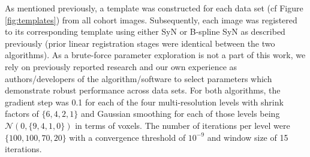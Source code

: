 \documentclass{frontiersSCNS}
\begin{document}

As mentioned previously, a template was constructed for each data
set (cf Figure \ref{fig:templates}) from all cohort images.  Subsequently, 
each image was registered to its corresponding template using either 
SyN or B-spline SyN as described previously (prior linear registration 
stages were identical between the two algorithms).  As a brute-force parameter
exploration is not a part of this work, we rely on previously
reported research \citep{klein2009,avants2011} and our own experience as
authors/developers of the algorithm/software to select parameters which 
demonstrate robust performance across data sets.  For both algorithms,
the gradient step was 0.1 for each of the four multi-resolution levels
with shrink factors of $\{6,4,2,1\}$ and Gaussian smoothing for each
of those levels being $\mathcal{N}\left(0,\{9,4,1,0\}\right)$ in terms
of voxels.  The number of iterations per level were $\{100,100,70,20\}$
with a convergence threshold of $10^{-9}$ and window size of 15 iterations.
\end{document}
